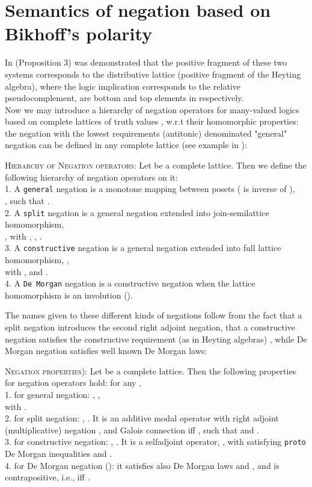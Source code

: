 \documentclass{llncs}
\begin{document}
\section{Semantics of negation based on Bikhoff's polarity}
In \cite{Majk08dc} (Proposition 3) was demonstrated that the
positive fragment of these two systems corresponds to the
distributive lattice  (positive fragment of the Heyting
algebra), where the logic implication corresponds to the relative
pseudocomplement,  are bottom and top elements in  respectively.\\
Now we may introduce a hierarchy of negation operators
\cite{Majk06ml} for many-valued logics based on complete lattices of
truth values , w.r.t their homomorphic properties: the
negation with the lowest requirements (antitonic) denominated
"general" negation can be defined in any complete lattice (see
example in \cite{Majk08dc}):
\begin{definition}
\textsc{Hierarchy of Negation operators:}  \label{def:negation} Let
 be a complete lattice. Then we define
the following hierarchy of negation operators on it:\\
1. A \verb"general" negation is a monotone mapping between posets ( is inverse of ),\\
, such that .\\
2. A \verb"split" negation is a general negation extended into
join-semilattice homomorphism,\\
, with
,
, .\\
 3. A \verb"constructive" negation is a general negation
extended into full
 lattice homomorphism,
,\\ with , and .\\
4. A \verb"De Morgan" negation is a constructive negation when the
 lattice homomorphism is an involution ().
 \end{definition}
 The names given to these different kinds of negations follow from
 the fact that a split negation introduces the second right adjoint
 negation, that a constructive negation satisfies the constructive
 requirement (as in Heyting algebras) ,
 while De Morgan negation satisfies well known De Morgan laws:
 \begin{lemma}
\textsc{Negation properties}): \label{lemma:negation}
  Let  be a complete lattice. Then the following properties for negation operators hold: for any ,\\
 1. for general negation: , ,\\ with 
.\\
 2. for split negation: , . It is an additive
 modal operator with right adjoint (multiplicative) negation , and Galois connection  iff , such that  and
 .\\
 3. for constructive negation: , . It is a selfadjoint
 operator, , with  satisfying
 \verb"proto" De Morgan inequalities  and .\\
 4. for De Morgan negation (): it satisfies also De Morgan laws  and , and is contrapositive, i.e.,  iff .
\end{lemma}
\end{document}
